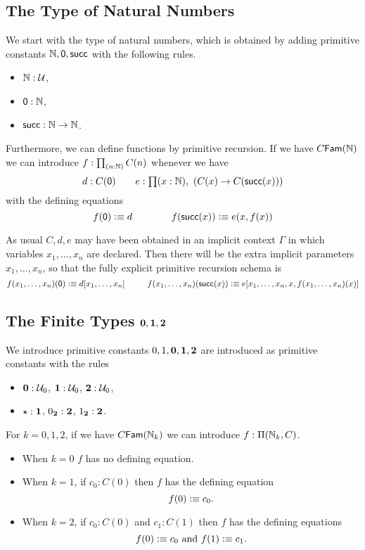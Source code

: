 \subsection*{The Type of Natural Numbers}
We start with
the type of natural numbers, which  is obtained by adding primitive constants
$\mathbb{N},{\sf 0},\mathsf{succ}$ with the following rules.
\begin{itemize}
\item $\mathbb{N} : \mathcal{U}$,
\item ${\sf 0}:\mathbb{N}$,
\item $\mathsf{succ}:\mathbb{N}\rightarrow \mathbb{N}$.
\end{itemize}

 Furthermore, we can define functions by primitive recursion.  If we have
$C{\sf Fam}(\mathbb{N})$ we can introduce $f:\prd{n:\N}C(n)$ whenever we have
\[
  d:C(\myzero)~~~~~~e:\prd{x:\N}(C(x)\rightarrow C(\suc (x)))
\]
with the defining equations
\[
  f({\sf 0}) \vcentcolon\equiv d~~~~~~~~~~~~f(\mathsf{succ} (x)) \vcentcolon\equiv e(x,f(x))
\]
 
As usual $C,d,e$ may have been obtained in an implicit context $\Gamma$ in which variables $x_1,\ldots,x_n$ are declared.  Then there will be the extra implicit parameters $x_1,\ldots,x_n$, so that the fully explicit primitive recursion schema is
\[
  f(x_1,\dots,x_n)({\sf 0}) \vcentcolon\equiv d[x_1,\dots,x_n]~~~~~~~~f(x_1,\dots,x_n)(\mathsf{succ} (x)) \vcentcolon\equiv e[x_1,\dots,x_n,x,f(x_1,\dots,x_n)(x)]
\]

\medskip
\subsection*{The Finite Types $\mathbf{0},\mathbf{1},\mathbf{2}$}

We introduce primitive constants $0,1,\mathbf{0},\mathbf{1},\mathbf{2}$ are introduced as primitive constants with the rules

\begin{itemize}
\item $\mathbf{0} : \mathcal{U}_0$, $\mathbf{1} : \mathcal{U}_0$, $\mathbf{2} : \mathcal{U}_0$,
\item $\star:\mathbf{1}$, $0_{\mathbf{2}}:\mathbf{2}$, $1_{\mathbf{2}}:\mathbf{2}$.
\end{itemize}
 For $k=0,1,2$, if we have $C{\sf Fam}(\mathbb{N}_k)$ we can introduce $f:\Pi(\mathbb{N}_k,C)$.
\begin{itemize}
\item When $k=0$ $f$ has no defining equation.  
\item When $k=1$, if $c_0:C(0)$ then $f$ has the defining equation
  \[ f(0)\vcentcolon\equiv c_0.\]
\item When $k=2$, if $c_0:C(0)$ and $c_1:C(1)$ then $f$ has the defining equations
  \[ f(0)\vcentcolon\equiv c_0\mbox{ and } f(1)\vcentcolon\equiv c_1.\]
\end{itemize}

